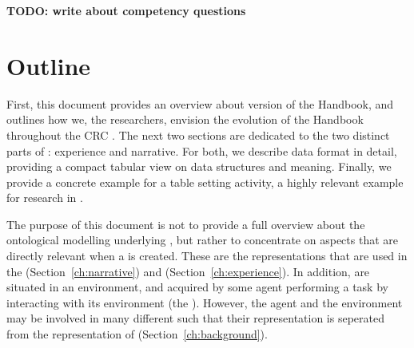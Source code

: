 \textbf{TODO: write about competency questions}

\section{Outline} %
First, this document provides an overview about version \neemversion of the \neem Handbook,
and outlines how we, the \ease researchers, envision the evolution of the \neem Handbook
throughout the CRC \ease.
The next two sections are dedicated to the two distinct parts of \neems: experience and narrative.
For both, we describe data format in detail, providing
a compact tabular view on data structures and meaning.
Finally, we provide a concrete example for a table setting activity,
a highly relevant example for research in \ease.

The purpose of this document is not to provide a full overview about the ontological modelling underlying \neems, but rather to concentrate on aspects that are directly relevant when a \neem is created.
These are the representations that are used in the \neemnar (Section~\ref{ch:narrative}) and \neemexp (Section~\ref{ch:experience}).
In addition, \neems are situated in an environment, and acquired by some agent performing a task by interacting with its environment (the \neembak).
However, the agent and the environment may be involved in many different \neems such that their representation is seperated from the representation of \neems (Section~\ref{ch:background}).

